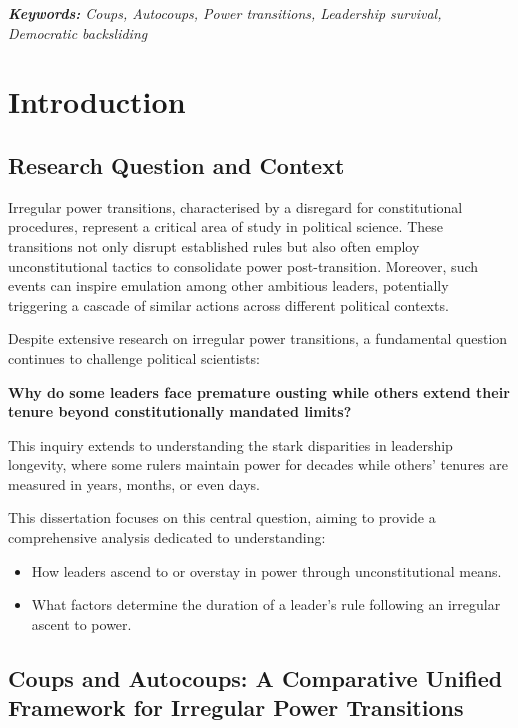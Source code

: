 \documentclass[
  12pt,
]{report}
\begin{document}
\emph{\textbf{Keywords:} Coups, Autocoups, Power transitions, Leadership
survival, Democratic backsliding}

\chapter{Introduction}\label{introduction}

\section{Research Question and
Context}\label{research-question-and-context}

Irregular power transitions, characterised by a disregard for
constitutional procedures, represent a critical area of study in
political science. These transitions not only disrupt established rules
but also often employ unconstitutional tactics to consolidate power
post-transition. Moreover, such events can inspire emulation among other
ambitious leaders, potentially triggering a cascade of similar actions
across different political contexts.

Despite extensive research on irregular power transitions, a fundamental
question continues to challenge political scientists:

\textbf{Why do some leaders face premature ousting while others extend
their tenure beyond constitutionally mandated limits?}

This inquiry extends to understanding the stark disparities in
leadership longevity, where some rulers maintain power for decades while
others' tenures are measured in years, months, or even days.

This dissertation focuses on this central question, aiming to provide a
comprehensive analysis dedicated to understanding:

\begin{itemize}
\item
  How leaders ascend to or overstay in power through unconstitutional
  means.
\item
  What factors determine the duration of a leader's rule following an
  irregular ascent to power.
\end{itemize}

\section{Coups and Autocoups: A Comparative Unified Framework for
Irregular Power
Transitions}\label{coups-and-autocoups-a-comparative-unified-framework-for-irregular-power-transitions}
\end{document}
